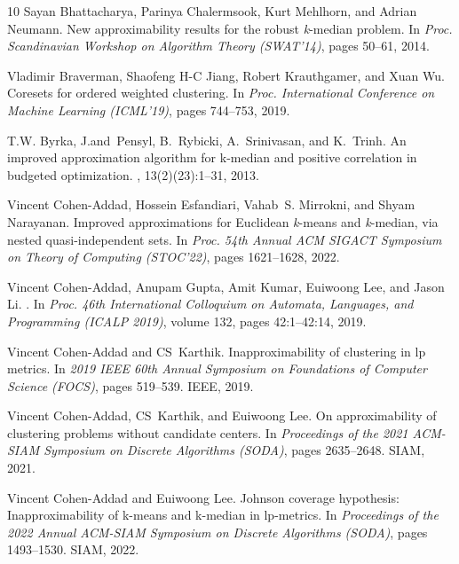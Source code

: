 \documentclass[11pt]{article}
\begin{document}
\begin{thebibliography}{10}
Sayan Bhattacharya, Parinya Chalermsook, Kurt Mehlhorn, and Adrian Neumann.
\newblock New approximability results for the robust \emph{k}-median problem.
\newblock In {\em Proc. Scandinavian Workshop on Algorithm Theory (SWAT'14)}, pages 50--61, 2014.

Vladimir Braverman, Shaofeng H-C Jiang, Robert Krauthgamer, and Xuan Wu.
\newblock Coresets for ordered weighted clustering.
\newblock In {\em Proc. International Conference on Machine Learning (ICML'19)}, pages 744--753, 2019.

T.W. Byrka, J.and~Pensyl, B.~Rybicki, A.~Srinivasan, and K.~Trinh.
\newblock An improved approximation algorithm for k-median and positive correlation in budgeted optimization.
, 13(2)(23):1--31, 2013.

Vincent Cohen{-}Addad, Hossein Esfandiari, Vahab~S. Mirrokni, and Shyam Narayanan.
\newblock Improved approximations for {Euclidean} \emph{k}-means and \emph{k}-median, via nested quasi-independent sets.
\newblock In {\em Proc. 54th Annual {ACM} {SIGACT} Symposium on Theory of Computing (STOC'22)}, pages 1621--1628, 2022.

Vincent Cohen-Addad, Anupam Gupta, Amit Kumar, Euiwoong Lee, and Jason Li.
.
\newblock In {\em Proc. 46th International Colloquium on Automata, Languages, and Programming (ICALP 2019)}, volume 132, pages 42:1--42:14, 2019.

Vincent Cohen-Addad and CS~Karthik.
\newblock Inapproximability of clustering in lp metrics.
\newblock In {\em 2019 IEEE 60th Annual Symposium on Foundations of Computer Science (FOCS)}, pages 519--539. IEEE, 2019.

Vincent Cohen-Addad, CS~Karthik, and Euiwoong Lee.
\newblock On approximability of clustering problems without candidate centers.
\newblock In {\em Proceedings of the 2021 ACM-SIAM Symposium on Discrete Algorithms (SODA)}, pages 2635--2648. SIAM, 2021.

Vincent Cohen-Addad and Euiwoong Lee.
\newblock Johnson coverage hypothesis: Inapproximability of k-means and k-median in lp-metrics.
\newblock In {\em Proceedings of the 2022 Annual ACM-SIAM Symposium on Discrete Algorithms (SODA)}, pages 1493--1530. SIAM, 2022.


\end{thebibliography}
\end{document}
